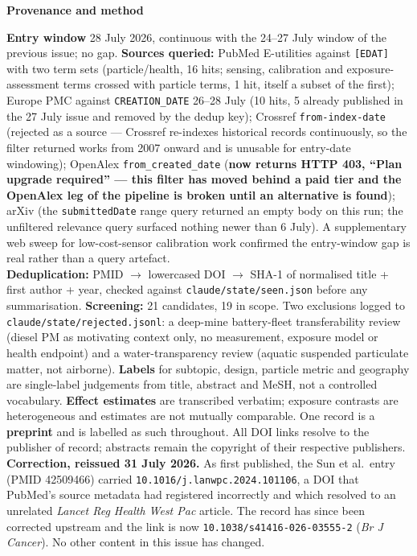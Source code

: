 \documentclass[10pt]{article}
\begin{document}
\vspace{4mm}
\begin{keybox}
{\sffamily\bfseries\footnotesize\color{Deep}Provenance and method}\\[1.2mm]
{\fontsize{7.2}{8.8}\selectfont
\textbf{Entry window} 28 July 2026, continuous with the 24--27 July window of the previous
issue; no gap. \textbf{Sources queried:} PubMed E-utilities against
\texttt{[EDAT]} with two term sets (particle/health, 16 hits; sensing, calibration and
exposure-assessment terms crossed with particle terms, 1 hit, itself a subset of the
first); Europe PMC against \texttt{CREATION\_DATE} 26--28 July (10 hits, 5 already
published in the 27 July issue and removed by the dedup key); Crossref
\texttt{from-index-date} (rejected as a source --- Crossref re-indexes historical records
continuously, so the filter returned works from 2007 onward and is unusable for
entry-date windowing); OpenAlex \texttt{from\_created\_date}
(\textbf{now returns HTTP 403, ``Plan upgrade required'' --- this filter has moved behind a
paid tier and the OpenAlex leg of the pipeline is broken until an alternative is found});
arXiv (the \texttt{submittedDate} range query returned an empty body on this run;
the unfiltered relevance query surfaced nothing newer than 6 July). A supplementary web
sweep for low-cost-sensor calibration work confirmed the entry-window gap is real rather
than a query artefact.\\[1.2mm]
\textbf{Deduplication:} PMID $\rightarrow$ lowercased DOI $\rightarrow$ SHA-1 of
normalised title + first author + year, checked against \texttt{claude/state/seen.json}
before any summarisation. \textbf{Screening:} 21 candidates, 19 in scope. Two exclusions
logged to \texttt{claude/state/rejected.jsonl}: a deep-mine battery-fleet transferability
review (diesel PM as motivating context only, no measurement, exposure model or health
endpoint) and a water-transparency review (aquatic suspended particulate matter, not
airborne). \textbf{Labels} for subtopic, design, particle metric and geography are
single-label judgements from title, abstract and MeSH, not a controlled vocabulary.
\textbf{Effect estimates} are transcribed verbatim; exposure contrasts are heterogeneous
and estimates are not mutually comparable. One record is a \textbf{preprint} and is
labelled as such throughout. All DOI links resolve to the publisher of record; abstracts
remain the copyright of their respective publishers.\\[1.2mm]
\textbf{Correction, reissued 31 July 2026.} As first published, the Sun et al.\ entry
(PMID 42509466) carried \texttt{10.1016/j.lanwpc.2024.101106}, a DOI that PubMed's source
metadata had registered incorrectly and which resolved to an unrelated
\textit{Lancet Reg Health West Pac} article. The record has since been corrected upstream
and the link is now \texttt{10.1038/s41416-026-03555-2}
(\textit{Br J Cancer}). No other content in this issue has changed.\par}
\end{keybox}
\end{document}
